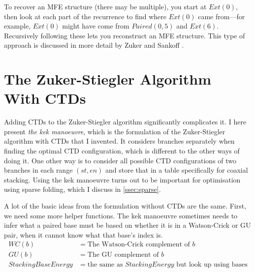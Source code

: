 \documentclass{cshonours}
\begin{document}
To recover an MFE structure (there may be multiple), you start at $Ext(0)$, then look at each part of the recurrence to find where $Ext(0)$ came from---for example, $Ext(0)$ might have come from $Paired(0, 5)$ and $Ext(6)$. Recursively following these lets you reconstruct an MFE structure. This type of approach is discussed in more detail by Zuker and Sankoff \cite{zukerSankoff}.

\section{The Zuker-Stiegler Algorithm With CTDs}
\label{sec:zuker_ctd}
Adding CTDs to the Zuker-Stiegler algorithm significantly complicates it. I here present \emph{the kek manoeuvre}, which is the formulation of the Zuker-Stiegler algorithm with CTDs that I invented. It considers branches separately when finding the optimal CTD configuration, which is different to the other ways of doing it. One other way is to consider all possible CTD configurations of two branches in each range $(st, en)$ and store that in a table specifically for coaxial stacking. Using the kek manoeuvre turns out to be important for optimisation using sparse folding, which I discuss in \autoref{ssec:sparse}.

A lot of the basic ideas from the formulation without CTDs are the same. First, we need some more helper functions. The kek manoeuvre sometimes needs to infer what a paired base must be based on whether it is in a Watson-Crick or GU pair, when it cannot know what that base's index is. 
\begin{align*}
WC(b) &= \text{The Watson-Crick complement of } b \\
GU(b) &= \text{The GU complement of } b \\
StackingBaseEnergy &= \text{the same as } StackingEnergy \text{ but look up using bases} \\
\end{align*}
\end{document}
